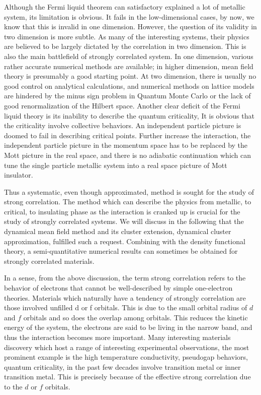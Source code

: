 Although the Fermi liquid theorem can satisfactory explained a lot of metallic
system, its limitation is obvious. It fails in the low-dimensional
cases, by now, we know that this is invalid in one dimension. However, the question 
of its validity in two dimension is more subtle. As many of the interesting systems, their
physics are believed to be largely dictated by the correlation in two dimension.
This is also the main battlefield of strongly correlated system. In one dimension, 
various rather accurate numerical methods are available; in higher dimension, 
mean field theory is presumably a good starting point. At two dimension, there is 
usually no good control on analytical calculations, and numerical methods on lattice
models are hindered by the minus sign problem in Quantum Monte Carlo or the lack
of good renormalization of the Hilbert space. Another clear deficit of the Fermi liquid 
theory is its inability to describe the quantum criticality, It is obvious that the 
criticality involve collective behaviors. An independent particle picture is 
doomed to fail in describing critical points. Further increase the interaction, 
the independent particle picture in the momentum space has to be replaced by the Mott 
picture in the real space, and there is no adiabatic continuation which can tune
the single particle metallic system into a real space picture of Mott insulator.

Thus a systematic, even though approximated, method is sought for the study of strong correlation. 
The method which can describe the physics from metallic, to critical, to insulating phase as 
the interaction is cranked up is crucial for the study of strongly correlated systems. 
We will discuss in the following that the dynamical mean field method and its cluster extension, 
dynamical cluster approximation, fulfilled such a request. Combining with the density functional theory,
a semi-quantitative numerical results can sometimes be obtained for strongly correlated materials. 


In a sense, from the above discussion, the term strong correlation refers to the behavior of electrons
that cannot be well-described by simple one-electron theories. Materials
which naturally have a tendency of strongly correlation are those involved
unfilled d or f orbitals. This is due to the small orbital radius of
$d$ and $f$ orbitals and so does the overlap among orbitals.
This reduces the kinetic energy of the system, the electrons are said to be living 
in the narrow band, and thus the interaction becomes more important. Many interesting materials discovery which host
a range of interesting experimental observations, the most prominent example is the
high temperature conductivity, pseudogap behaviors, quantum
criticality, in the past few decades involve transition
metal or inner transition metal. This is precisely because of the effective
strong correlation due to the $d$ or $f$ orbitals.

